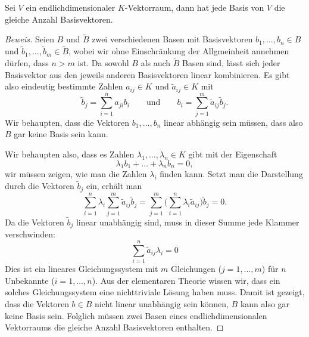 \begin{lemma}
Sei $V$ ein endlichdimensionaler $K$-Vektorraum, dann hat jede Basis
von $V$ die gleiche Anzahl Basisvektoren.
\end{lemma}

\begin{proof}[Beweis]
Seien $B$ und $\tilde B$ zwei verschiedenen Basen mit Basisvektoren
$b_1,\dots,b_n\in B$ und $\tilde b_1,\dots,\tilde b_m\in \tilde B$,
wobei wir ohne Einschränkung der Allgmeinheit annehmen dürfen, dass $n>m$
ist.
Da sowohl $B$ als auch $\tilde B$ Basen sind, lässt sich jeder Basisvektor
aus den jeweils anderen Basisvektoren linear kombinieren.
Es gibt also eindeutig bestimmte Zahlen $a_{ij}\in K$ und
$\tilde a_{ij}\in K$ mit
\[
\tilde b_j = \sum_{i=1}^n a_{ji} b_i
\qquad\text{und}\qquad
b_i = \sum_{j=1}^m \tilde a_{ij}\tilde b_j.
\]
Wir behaupten, dass die Vektoren $b_1,\dots,b_n$ linear abhängig sein 
müssen, dass also $B$ gar keine Basis sein kann.

Wir behaupten also, dass es Zahlen $\lambda_1,\dots,\lambda_n\in K$
gibt mit der Eigenschaft
\[
\lambda_1 b_1+\dots+\lambda_n b_n = 0,
\]
wir müssen zeigen, wie man die Zahlen $\lambda_i$ finden kann.
Setzt man die Darstellung durch die Vektoren $\tilde b_j$ ein, erhält man
\[
\sum_{i=1}^n
\lambda_i
\sum_{j=1}^m
\tilde a_{ij}\tilde b_j
=
\sum_{j=1}^m
\biggl(
\sum_{i=1}^n
\lambda_i
\tilde a_{ij}
\biggr)
\tilde b_j
=
0.
\]
Da die Vektoren $\tilde b_j$ linear unabhängig sind, muss in dieser
Summe jede Klammer verschwinden:
\[
\sum_{i=1}^n \tilde a_{ij}\lambda_i =0 
\]
Dies ist ein lineares Gleichungssystem mit $m$ Gleichungen ($j=1,\dots,m$)
für $n$ Unbekannte ($i=1,\dots,n$).
Aus der elementaren Theorie wissen wir, dass ein solches Gleichungssystem
eine nichttriviale Lösung haben muss.
Damit ist gezeigt, dass die Vektoren $b\in B$ nicht linear unabhängig sein
können, $B$ kann also gar keine Basis sein.
Folglich müssen zwei Basen eines endlichdimensionalen Vektorraums
die gleiche Anzahl Basisvektoren enthalten.
\end{proof}

